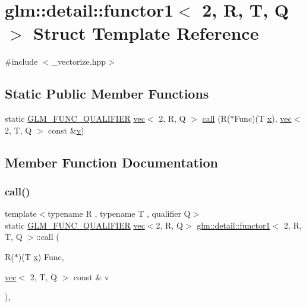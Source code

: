 \hypertarget{structglm_1_1detail_1_1functor1_3_012_00_01_r_00_01_t_00_01_q_01_4}{}\section{glm\+:\+:detail\+:\+:functor1$<$ 2, R, T, Q $>$ Struct Template Reference}
\label{structglm_1_1detail_1_1functor1_3_012_00_01_r_00_01_t_00_01_q_01_4}


{\ttfamily \#include $<$\+\_\+vectorize.\+hpp$>$}

\subsection*{Static Public Member Functions}
\begin{DoxyCompactItemize}
\item 
static \hyperlink{setup_8hpp_a33fdea6f91c5f834105f7415e2a64407}{G\+L\+M\+\_\+\+F\+U\+N\+C\+\_\+\+Q\+U\+A\+L\+I\+F\+I\+ER} \hyperlink{structglm_1_1vec}{vec}$<$ 2, R, Q $>$ \hyperlink{structglm_1_1detail_1_1functor1_3_012_00_01_r_00_01_t_00_01_q_01_4_a99959412228366dac1483414dcde0092}{call} (R($\ast$Func)(T \hyperlink{_s_d_l__opengl_8h_ad0e63d0edcdbd3d79554076bf309fd47}{x}), \hyperlink{structglm_1_1vec}{vec}$<$ 2, T, Q $>$ const \&\hyperlink{_s_d_l__opengl_8h_a10a82eabcb59d2fcd74acee063775f90}{v})
\end{DoxyCompactItemize}


\subsection{Member Function Documentation}
\mbox{\label{structglm_1_1detail_1_1functor1_3_012_00_01_r_00_01_t_00_01_q_01_4_a99959412228366dac1483414dcde0092}} 
\subsubsection{\texorpdfstring{call()}{call()}}
{\footnotesize\ttfamily template$<$typename R , typename T , qualifier Q$>$ \\
static \hyperlink{setup_8hpp_a33fdea6f91c5f834105f7415e2a64407}{G\+L\+M\+\_\+\+F\+U\+N\+C\+\_\+\+Q\+U\+A\+L\+I\+F\+I\+ER} \hyperlink{structglm_1_1vec}{vec}$<$2, R, Q$>$ \hyperlink{structglm_1_1detail_1_1functor1}{glm\+::detail\+::functor1}$<$ 2, R, T, Q $>$\+::call (\begin{DoxyParamCaption}\item[{R($\ast$)(T \hyperlink{_s_d_l__opengl_8h_ad0e63d0edcdbd3d79554076bf309fd47}{x})}]{Func,  }\item[{\hyperlink{structglm_1_1vec}{vec}$<$ 2, T, Q $>$ const \&}]{v }\end{DoxyParamCaption})\hspace{0.3cm}{\ttfamily [inline]}, {\ttfamily [static]}}



